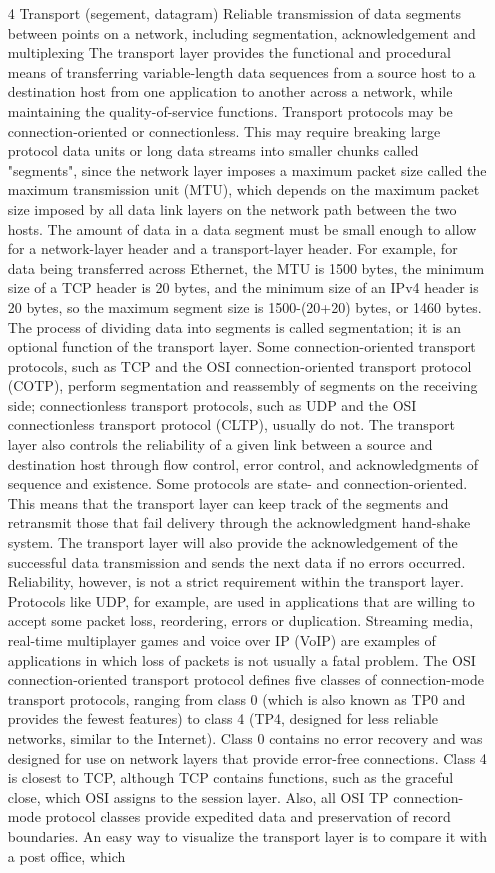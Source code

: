 \documentclass{article}
\begin{document}
\begin{enumerate}[label = \arabic*]
\item[4] Transport (segement, datagram) Reliable transmission of data segments between points on a network, including segmentation, acknowledgement and multiplexing
	\subitem The transport layer provides the functional and procedural means of transferring variable-length data sequences from a source host to a destination host from one application to another across a network, while maintaining the quality-of-service functions. Transport protocols may be connection-oriented or connectionless. This may require breaking large protocol data units or long data streams into smaller chunks called "segments", since the network layer imposes a maximum packet size called the maximum transmission unit (MTU), which depends on the maximum packet size imposed by all data link layers on the network path between the two hosts. The amount of data in a data segment must be small enough to allow for a network-layer header and a transport-layer header. For example, for data being transferred across Ethernet, the MTU is 1500 bytes, the minimum size of a TCP header is 20 bytes, and the minimum size of an IPv4 header is 20 bytes, so the maximum segment size is 1500-(20+20) bytes, or 1460 bytes. The process of dividing data into segments is called segmentation; it is an optional function of the transport layer. Some connection-oriented transport protocols, such as TCP and the OSI connection-oriented transport protocol (COTP), perform segmentation and reassembly of segments on the receiving side; connectionless transport protocols, such as UDP and the OSI connectionless transport protocol (CLTP), usually do not. The transport layer also controls the reliability of a given link between a source and destination host through flow control, error control, and acknowledgments of sequence and existence. Some protocols are state- and connection-oriented. This means that the transport layer can keep track of the segments and retransmit those that fail delivery through the acknowledgment hand-shake system. The transport layer will also provide the acknowledgement of the successful data transmission and sends the next data if no errors occurred. Reliability, however, is not a strict requirement within the transport layer. Protocols like UDP, for example, are used in applications that are willing to accept some packet loss, reordering, errors or duplication. Streaming media, real-time multiplayer games and voice over IP (VoIP) are examples of applications in which loss of packets is not usually a fatal problem. The OSI connection-oriented transport protocol defines five classes of connection-mode transport protocols, ranging from class 0 (which is also known as TP0 and provides the fewest features) to class 4 (TP4, designed for less reliable networks, similar to the Internet). Class 0 contains no error recovery and was designed for use on network layers that provide error-free connections. Class 4 is closest to TCP, although TCP contains functions, such as the graceful close, which OSI assigns to the session layer. Also, all OSI TP connection-mode protocol classes provide expedited data and preservation of record boundaries. An easy way to visualize the transport layer is to compare it with a post office, which 
\end{enumerate}
\end{document}
